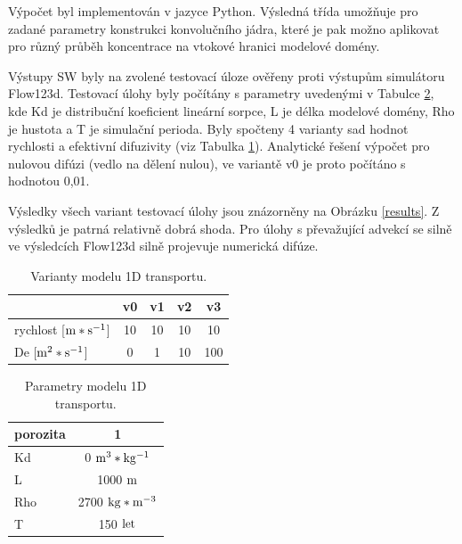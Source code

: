 \documentclass[11pt,a4paper]{article}
\begin{document}
\begin{onehalfspacing}
Výpočet byl implementován v jazyce Python. Výsledná třída umožňuje pro zadané parametry konstrukci konvolučního jádra, 
které je pak možno aplikovat pro různý průběh koncentrace na vtokové hranici modelové domény. 

Výstupy SW byly na zvolené testovací úloze ověřeny proti výstupům simulátoru Flow123d. 
Testovací úlohy byly počítány s parametry uvedenými v Tabulce \ref{parametry}, kde Kd je distribuční koeficient lineární sorpce, 
L je délka modelové domény, Rho je hustota a T je simulační perioda. Byly spočteny 4 varianty sad hodnot rychlosti a efektivní difuzivity (viz Tabulka \ref{varianty}). Analytické řešení výpočet pro nulovou difúzi (vedlo na dělení nulou), ve variantě v0 je proto počítáno s hodnotou 0,01.

Výsledky všech variant testovací úlohy jsou znázorněny na Obrázku \ref{results}. 
Z výsledků je patrná relativně dobrá shoda. Pro úlohy s převažující advekcí se silně ve výsledcích Flow123d silně projevuje 
numerická difúze.

\begin{table}[ht]
\begin{center}
    \caption{Varianty modelu 1D transportu.}
    \begin{tabular}{ | l | c | c | c | c |}
    \hline
    \small  & \small v0 & \small v1 & \small v2 & \small v3\\ \hline
    \small rychlost [$\rm m*s^{-1}$] & \small 10 & \small 10 & \small 10 & \small 10\\ \hline
    \small De [$\rm m^{2}*s^{-1}$] & \small 0 & \small 1 & \small 10 & \small 100\\ \hline
    \end{tabular}
    \label{varianty}
\end{center}
\end{table}

\begin{table}[ht]
\begin{center}
    \caption{Parametry modelu 1D transportu.}
    \begin{tabular}{ | l | c |}
    \hline
    \small porozita & \small 1\\ \hline
    \small Kd & \small 0 $\rm m^{3}*kg^{-1}$\\ \hline
    \small L & \small 1000 $\rm m$\\ \hline
    \small Rho & \small 2700 $\rm kg*m^{-3}$\\ \hline
    \small T & \small 150 $\rm let$\\ \hline
    \end{tabular}
    \label{parametry}
\end{center}
\end{table}


\end{onehalfspacing}
\end{document}
